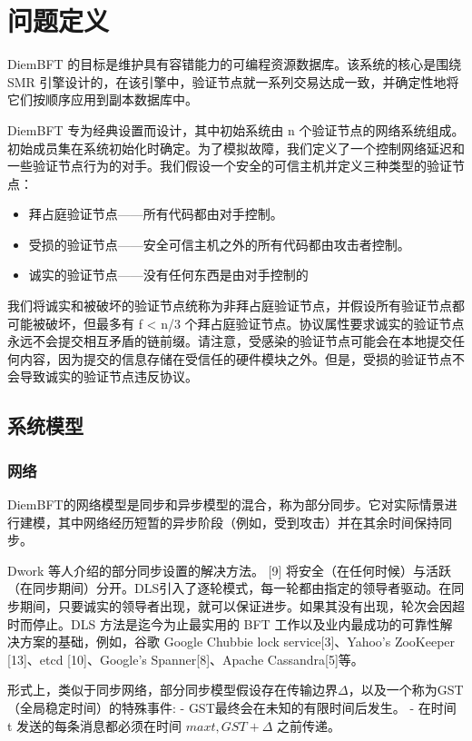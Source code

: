 \section{问题定义}

DiemBFT 的目标是维护具有容错能力的可编程资源数据库。该系统的核心是围绕 SMR 引擎设计的，在该引擎中，验证节点就一系列交易达成一致，并确定性地将它们按顺序应用到副本数据库中。

DiemBFT 专为经典设置而设计，其中初始系统由 n 个验证节点的网络系统组成。初始成员集在系统初始化时确定。为了模拟故障，我们定义了一个控制网络延迟和一些验证节点行为的对手。我们假设一个安全的可信主机并定义三种类型的验证节点：

\begin{itemize}
    \item 拜占庭验证节点——所有代码都由对手控制。
    \item 受损的验证节点——安全可信主机之外的所有代码都由攻击者控制。
    \item 诚实的验证节点——没有任何东西是由对手控制的
\end{itemize}

我们将诚实和被破坏的验证节点统称为非拜占庭验证节点，并假设所有验证节点都可能被破坏，但最多有 f < n/3 个拜占庭验证节点。协议属性要求诚实的验证节点永远不会提交相互矛盾的链前缀。请注意，受感染的验证节点可能会在本地提交任何内容，因为提交的信息存储在受信任的硬件模块之外。但是，受损的验证节点不会导致诚实的验证节点违反协议。


\subsection{系统模型}

\subsubsection{网络}

DiemBFT的网络模型是同步和异步模型的混合，称为部分同步。它对实际情景进行建模，其中网络经历短暂的异步阶段（例如，受到攻击）并在其余时间保持同步。

Dwork 等人介绍的部分同步设置的解决方法。 [9] 将安全（在任何时候）与活跃（在同步期间）分开。DLS引入了逐轮模式，每一轮都由指定的领导者驱动。在同步期间，只要诚实的领导者出现，就可以保证进步。如果其没有出现，轮次会因超时而停止。DLS 方法是迄今为止最实用的 BFT 工作以及业内最成功的可靠性解决方案的基础，例如，谷歌 Google Chubbie lock service[3]、Yahoo’s ZooKeeper [13]、etcd [10]、Google’s Spanner[8]、Apache Cassandra[5]等。

形式上，类似于同步网络，部分同步模型假设存在传输边界$\Delta$，以及一个称为GST（全局稳定时间）的特殊事件:
- GST最终会在未知的有限时间后发生。
- 在时间 t 发送的每条消息都必须在时间 $ max{t,GST} + \Delta$ 之前传递。

